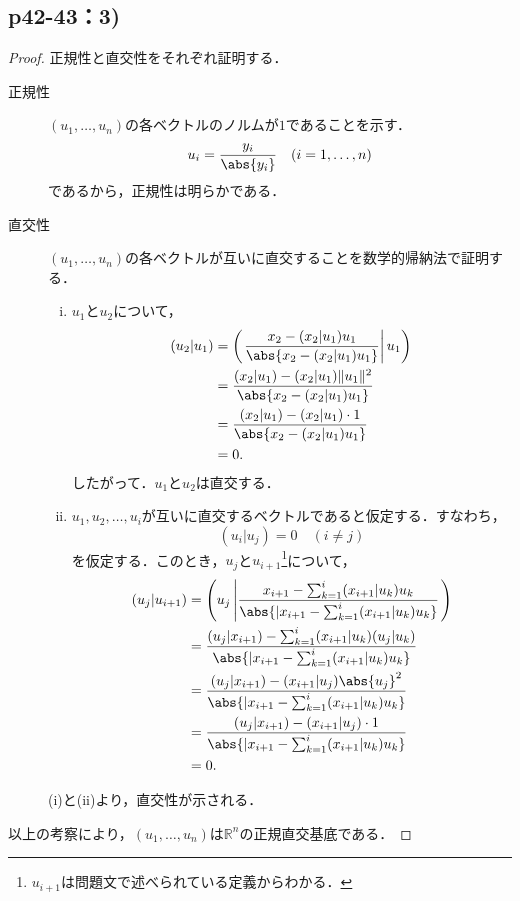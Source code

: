 \documentclass[uplatex,dvipdfmx,a4paper,10pt,fleqn]{jsarticle}
\begin{document}
\subsection*{p42-43：3)}


\begin{tleftbar}
\begin{proof}
  正規性と直交性をそれぞれ証明する．
  \begin{description}
  \item[正規性] $(u_1, \ldots, u_n)$の各ベクトルのノルムが$1$であることを示す．
  \[
    u_i = \frac{y_i}{\abs{y_i}} \quad (i = 1, \ldots, n)
  \]
  であるから，正規性は明らかである．
\item[直交性] $(u_1, \ldots, u_n)$の各ベクトルが互いに直交することを数学的帰納法で証明する．
\begin{enumerate}[(i)]
    \item $u_1$と$u_2$について，
    \begin{align*}
    (u_2 | u_1) &= \left(\left. \frac{x_2 - (x_2 | u_1) u_1}{\abs{ x_2 - (x_2 | u_1) u_1 }} \right|u_1 \right) \\
    &= \frac{(x_2 | u_1) - (x_2 | u_1) \|u_1\|^2}{\abs{ x_2 - (x_2 | u_1) u_1 }} \\
    &= \frac{(x_2 | u_1) - (x_2 | u_1) \cdot 1}{\abs{ x_2 - (x_2 | u_1) u_1 }} \\
    &= 0.
    \end{align*}
    したがって．$u_1$と$u_2$は直交する．
    
    \item $u_1, u_2, \ldots, u_i$が互いに直交するベクトルであると仮定する．すなわち，
    \[
      (u_i | u_j) = 0 \quad (i \ne j)
    \]
    を仮定する．このとき，$u_j$と$u_{i+1}$\footnote{$u_{i+1}$は問題文で述べられている定義からわかる．}について，
    \begin{align*}
    (u_j | u_{i+1}) &=\left  ( u_j \left| \frac{x_{i+1} - \sum_{k=1}^{i} (x_{i+1} | u_k) u_k}{\abs{| x_{i+1} - \sum_{k=1}^{i} (x_{i+1} | u_k) u_k }} \right. \right) \\
    &= \frac{(u_j | x_{i+1}) - \sum_{k=1}^{i} (x_{i+1} | u_k) (u_j | u_k)}{\abs{| x_{i+1} - \sum_{k=1}^{i} (x_{i+1} | u_k) u_k }} \\
    &= \frac{(u_j | x_{i+1}) - (x_{i+1} | u_j) \abs{u_j}^2}{\abs{| x_{i+1} - \sum_{k=1}^{i} (x_{i+1} | u_k) u_k }} \\
    &= \frac{(u_j | x_{i+1}) - (x_{i+1} | u_j) \cdot 1}{\abs{| x_{i+1} - \sum_{k=1}^{i} (x_{i+1} | u_k) u_k }} \\
    &= 0.
    \end{align*}
\end{enumerate}
(i)と(ii)より，直交性が示される．
\end{description}
以上の考察により，$(u_1, \ldots, u_n)$は$\mathbb{R}^n$の正規直交基底である．
\end{proof}
\end{tleftbar}
\end{document}

